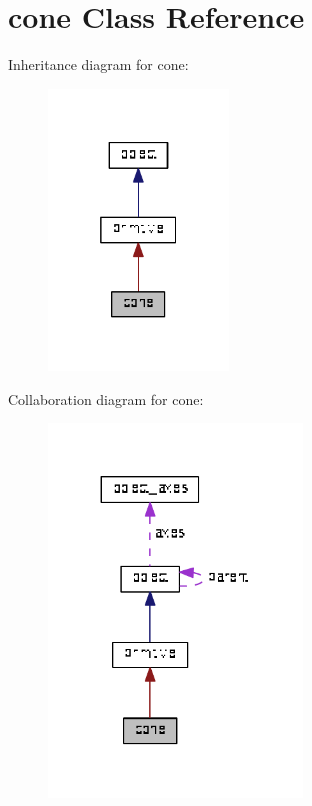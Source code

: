 \hypertarget{classcone}{}\section{cone Class Reference}
\label{classcone}


Inheritance diagram for cone\+:\nopagebreak
\begin{figure}[H]
\begin{center}
\leavevmode
\includegraphics[width=136pt]{classcone__inherit__graph}
\end{center}
\end{figure}


Collaboration diagram for cone\+:\nopagebreak
\begin{figure}[H]
\begin{center}
\leavevmode
\includegraphics[width=191pt]{classcone__coll__graph}
\end{center}
\end{figure}
